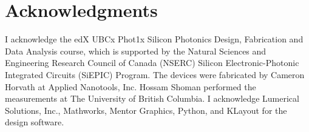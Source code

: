 \documentclass[journal]{IEEEtran}
\begin{document}
\section*{Acknowledgments}

I acknowledge the edX UBCx Phot1x Silicon Photonics Design, Fabrication and Data Analysis course, which is supported by the Natural Sciences and Engineering Research Council of Canada (NSERC) Silicon Electronic-Photonic Integrated Circuits (SiEPIC) Program. The devices were fabricated by Cameron Horvath at Applied Nanotools, Inc. Hossam Shoman performed the measurements at The University of British Columbia. I acknowledge Lumerical Solutions, Inc., Mathworks, Mentor Graphics, Python, and KLayout for the design software.






\end{document}
